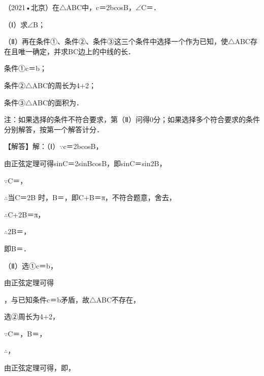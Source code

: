 \begin{question}
（2021•北京）在$\triangle$ABC中，c＝2bcosB，$\angle$C＝\allowbreak{}．\par
（Ⅰ）求$\angle$B；\par
（Ⅱ）再在条件①、条件②、条件③这三个条件中选择一个作为已知，使$\triangle$ABC存在且唯一确定，并求BC边上的中线的长．\par
条件①c＝\allowbreak{}b；\par
条件②$\triangle$ABC的周长为4+2\allowbreak{}；\par
条件③$\triangle$ABC的面积为\allowbreak{}．\par
注：如果选择的条件不符合要求，第（Ⅱ）问得0分；如果选择多个符合要求的条件分别解答，按第一个解答计分．\par
\begin{solution}
【解答】解：（Ⅰ）$\because$c＝2bcosB，\par
由正弦定理可得sinC＝2sinBcosB，即sinC＝sin2B，\par
$\because$C＝\allowbreak{}，\par
$\therefore$当C＝2B 时，B＝\allowbreak{}，即C+B＝π，不符合题意，舍去，\par
$\therefore$C+2B＝π，\par
$\therefore$2B＝\allowbreak{}，\par
即B＝\allowbreak{}．\par
（Ⅱ）选①c＝\allowbreak{}b，\par
由正弦定理可得\par
{}\allowbreak{}，与已知条件c＝\allowbreak{}b矛盾，故$\triangle$ABC不存在，\par
选②周长为4+2\allowbreak{}，\par
$\because$C＝\allowbreak{}，B＝\allowbreak{}，\par
$\therefore$\allowbreak{}，\par
由正弦定理可得\allowbreak{}，即\allowbreak{}，\par

\end{solution}
\end{question}
